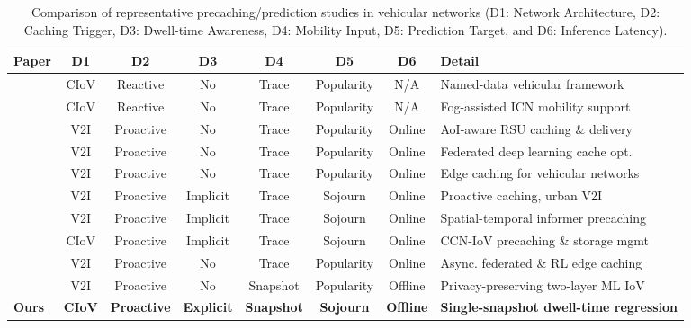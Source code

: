 \documentclass[journal]{IEEEtran}
\begin{document}
\begin{table}[!t]
\centering
\caption{Comparison of representative precaching/prediction studies in vehicular networks (D1: Network Architecture, D2: Caching Trigger, D3: Dwell-time Awareness, D4: Mobility Input, D5: Prediction Target, and D6: Inference Latency).}
\label{tab:related_work}
\begin{tabular}{@{}lccccccl@{}}
\toprule
\textbf{Paper} & \textbf{D1} & \textbf{D2} & \textbf{D3} & \textbf{D4} & \textbf{D5} & \textbf{D6} & \textbf{Detail} \\
\midrule
\cite{2}  & CIoV & Reactive  & No  & Trace    & Popularity & N/A     & Named-data vehicular framework \\
\cite{3}  & CIoV & Reactive  & No  & Trace    & Popularity & N/A     & Fog-assisted ICN mobility support \\
\cite{28} & V2I  & Proactive & No  & Trace    & Popularity & Online  & AoI-aware RSU caching \& delivery \\
\cite{16} & V2I  & Proactive & No  & Trace    & Popularity & Online  & Federated deep learning cache opt. \\
\cite{5} & V2I  & Proactive & No  & Trace    & Popularity & Online  & Edge caching for vehicular networks \\
\cite{7} & V2I  & Proactive & Implicit & Trace & Sojourn  & Online  & Proactive caching, urban V2I \\
\cite{23} & V2I  & Proactive & Implicit & Trace & Sojourn  & Online  & Spatial-temporal informer precaching \\
\cite{4} & CIoV & Proactive & Implicit & Trace & Sojourn  & Online  & CCN-IoV precaching \& storage mgmt \\
\cite{21} & V2I  & Proactive & No  & Trace    & Popularity & Online  & Async. federated \& RL edge caching \\
\cite{11} & V2I  & Proactive & No  & Snapshot & Popularity & Offline & Privacy-preserving two-layer ML IoV \\
\textbf{Ours} & \textbf{CIoV} & \textbf{Proactive} & \textbf{Explicit} & \textbf{Snapshot} & \textbf{Sojourn} & \textbf{Offline} & \textbf{Single-snapshot dwell-time regression} \\
\bottomrule
\end{tabular}
\end{table}
\end{document}
